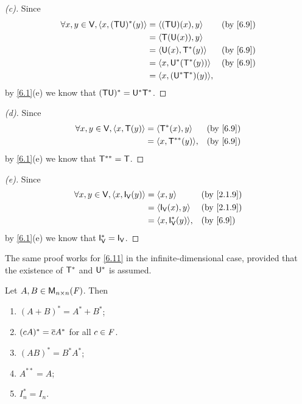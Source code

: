 \begin{proof}[(c)]
	Since
	\begin{align*}
		\forall x, y \in \V, \inn{x, (\T \U)^*(y)} & = \inn{(\T \U)(x), y}      &  & \by{6.9} \\
		                                           & = \inn{\T(\U(x)), y}                     \\
		                                           & = \inn{\U(x), \T^*(y)}     &  & \by{6.9} \\
		                                           & = \inn{x, \U^*(\T^*(y))}   &  & \by{6.9} \\
		                                           & = \inn{x, (\U^* \T^*)(y)},
	\end{align*}
	by \cref{6.1}(e) we know that \((\mathsf{T} \mathsf{U})^* = \mathsf{U}^* \mathsf{T}^*\).
\end{proof}

\begin{proof}[(d)]
	Since
	\begin{align*}
		\forall x, y \in \V, \inn{x, \T(y)} & = \inn{\T^*(x), y}     &  & \by{6.9} \\
		                                    & = \inn{x, \T^{**}(y)}, &  & \by{6.9}
	\end{align*}
	by \cref{6.1}(e) we know that \(\mathsf{T}^{**} = \mathsf{T}\).
\end{proof}

\begin{proof}[(e)]
	Since
	\begin{align*}
		\forall x, y \in \V, \inn{x, \IT[\V](y)} & = \inn{x, y}             &  & \by{2.1.9} \\
		                                         & = \inn{\IT[\V](x), y}    &  & \by{2.1.9} \\
		                                         & = \inn{x, \IT[\V]^*(y)}, &  & \by{6.9}
	\end{align*}
	by \cref{6.1}(e) we know that \(\IT[\V]^* = \IT[\V]\).
\end{proof}

\begin{note}
	The same proof works for \cref{6.11} in the infinite-dimensional case, provided that the existence of \(\mathsf{T}^*\) and \(\mathsf{U}^*\) is assumed.
\end{note}

\begin{cor}\label{6.3.2}
	Let \(A, B \in \ms[n][n][\F]\).
	Then
	\begin{enumerate}
		\item \((A + B)^* = A^* + B^*\);
		\item \((cA)^* = \overline{c} A^*\) for all \(c \in \mathit{F}\).
		\item \((AB)^* = B^* A^*\);
		\item \(A^{**} = A\);
		\item \(I_n^* = I_n\).
	\end{enumerate}
\end{cor}

